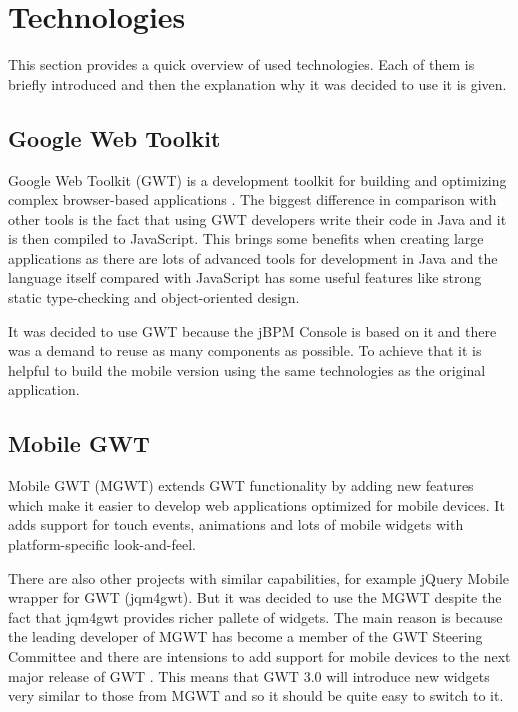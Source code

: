 \documentclass[12pt,oneside,final]{fithesis2}
\begin{document}
\section{Technologies}
This section provides a quick overview of used technologies.
Each of them is briefly introduced and then the explanation why it was decided to use it is given.

\subsection{Google Web Toolkit}
Google Web Toolkit (GWT) is a development toolkit for building and optimizing complex browser-based applications \cite{gwtoverview}.
The biggest difference in comparison with other tools is the fact that using GWT developers write their code in Java and it is then compiled to JavaScript.
This brings some benefits when creating large applications as there are lots of advanced tools for development in Java and the language itself compared with JavaScript has some useful features like strong static type-checking and object-oriented design.

It was decided to use GWT because the jBPM Console is based on it and there was a demand to reuse as many components as possible.
To achieve that it is helpful to build the mobile version using the same technologies as the original application.

\subsection{Mobile GWT}
Mobile GWT (MGWT) extends GWT functionality by adding new features which make it easier to develop web applications optimized for mobile devices.
It adds support for touch events, animations and lots of mobile widgets with platform-specific look-and-feel.

There are also other projects with similar capabilities, for example jQuery Mobile wrapper for GWT\footnotemark{} (jqm4gwt).
But it was decided to use the MGWT despite the fact that jqm4gwt provides richer pallete of widgets.
The main reason is because the leading developer of MGWT has become a member of the GWT Steering Committee and there are intensions to add support for mobile devices to the next major release of GWT \cite{gwtroadmap}.
This means that GWT 3.0 will introduce new widgets very similar to those from MGWT and so it should be quite easy to switch to it.
\end{document}
